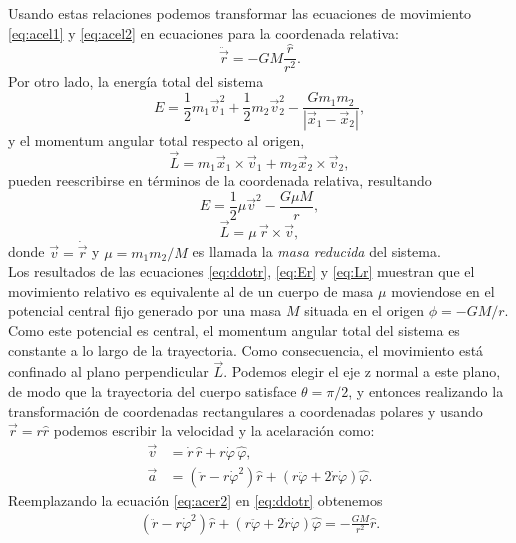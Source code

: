 Usando estas relaciones podemos transformar las ecuaciones de movimiento \ref{eq:acel1} y \ref{eq:acel2} en ecuaciones para la coordenada relativa:
\begin{equation}
    \ddot{\vec{r}}=-GM \frac{\hat{r}}{r^2}.
    \label{eq:ddotr}
\end{equation}
Por otro lado, la energía total del sistema
\begin{equation}
    E=\frac{1}{2}m_1\vec{v}_1^2+\frac{1}{2}m_2\vec{v}_2^2-\frac{Gm_1m_2}{|\vec{x}_1-\vec{x}_2|},
\end{equation}
y el momentum angular total respecto al origen,
\begin{equation}
    \vec{L}=m_1\vec{x}_1\times\vec{v}_1+m_2\vec{x}_2\times\vec{v}_2,
\end{equation}
pueden reescribirse en términos de la coordenada relativa, resultando
\begin{equation}\label{eq:Er}
    E=\frac{1}{2}\mu \vec{v}^2-\frac{G\mu M}{r},
\end{equation}
\begin{equation}\label{eq:Lr}
    \vec{L}=\mu\,\vec{r}\times\vec{v},
\end{equation}
donde $\vec{v}=\dot{\vec{r}}$ y $\mu=m_1m_2/M$ es llamada la \textit{masa reducida} del sistema.\\
Los resultados de las ecuaciones \ref{eq:ddotr}, \ref{eq:Er} y \ref{eq:Lr} muestran que el movimiento relativo es equivalente
al de un cuerpo de masa $\mu$ moviendose en el potencial central fijo generado por una masa $M$ situada en el origen 
$\phi=-GM/r$. Como este potencial es central, el momentum angular total del sistema es constante a lo largo de la trayectoria. 
Como consecuencia, el movimiento está confinado al plano perpendicular $\vec{L}$. Podemos elegir el eje z normal a este plano, de modo que la trayectoria del
cuerpo satisface $\theta=\pi/2$, y entonces realizando la transformación de coordenadas rectangulares a coordenadas polares y usando $\vec{r}=r\hat{r}$ podemos
escribir la velocidad y la acelaración como:
\begin{align}
    \vec{v} & = \dot{r}\,\hat{r}+r\dot{\varphi}\,\hat{\varphi} ,\label{eq:vel1}\\
    \vec{a} & = \left(\ddot{r}-r\dot{\varphi}^2\right)\hat{r} +\left(r\ddot{\varphi}+2\dot{r}\dot{\varphi}\right)\hat{\varphi} .\label{eq:acer2}
\end{align}
Reemplazando la ecuación \ref{eq:acer2} en \ref{eq:ddotr} obtenemos
\begin{eqnarray}
    \left(\ddot{r}-r\dot{\varphi}^2\right)\hat{r}+
    \left(r\ddot{\varphi}+2\dot{r}\dot{\varphi}\right)\hat{\varphi}
    =-\frac{GM}{r^2}\hat{r}.
\end{eqnarray}
